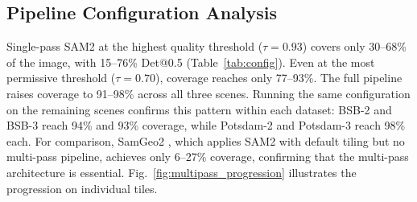 \documentclass[review,11pt,authoryear]{elsarticle}
\begin{document}
\subsection{Pipeline Configuration Analysis}
\label{sec:res_config}
\label{sec:res_ablation}

Single-pass SAM2 at the highest quality threshold ($\tau = 0.93$) covers only 30--68\% of the image, with 15--76\% Det@0.5 (Table~\ref{tab:config}). Even at the most permissive threshold ($\tau = 0.70$), coverage reaches only 77--93\%. The full pipeline raises coverage to 91--98\% across all three scenes. Running the same configuration on the remaining scenes confirms this pattern within each dataset: BSB-2 and BSB-3 reach 94\% and 93\% coverage, while Potsdam-2 and Potsdam-3 reach 98\% each. For comparison, SamGeo2 \citep{wu2023samgeo}, which applies SAM2 with default tiling but no multi-pass pipeline, achieves only 6--27\% coverage, confirming that the multi-pass architecture is essential. Fig.~\ref{fig:multipass_progression} illustrates the progression on individual tiles.
\end{document}
